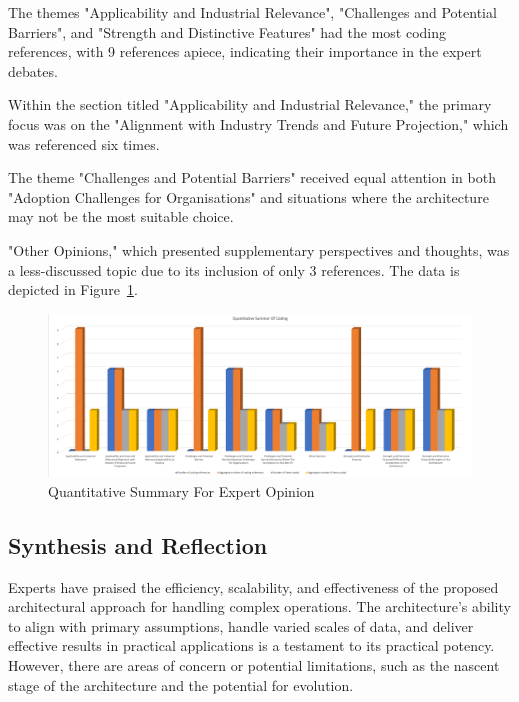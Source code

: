 \documentclass[review]{elsarticle}
\begin{document}
The themes "Applicability and Industrial Relevance", "Challenges and Potential Barriers", and "Strength and Distinctive Features" had the most coding references, with 9 references apiece, indicating their importance in the expert debates.

Within the section titled "Applicability and Industrial Relevance," the primary focus was on the "Alignment with Industry Trends and Future Projection," which was referenced six times.

The theme "Challenges and Potential Barriers" received equal attention in both "Adoption Challenges for Organisations" and situations where the architecture may not be the most suitable choice.

"Other Opinions," which presented supplementary perspectives and thoughts, was a less-discussed topic due to its inclusion of only 3 references. The data is depicted in Figure~\ref{fig:quantitativeSummaryForExpertOpinion}.

\begin{figure}[h]

  \centering

  \includegraphics[width=\textwidth]{images/Quantitative-Summary-For-Codes.png}

  \caption{Quantitative Summary For Expert Opinion}

  \label{fig:quantitativeSummaryForExpertOpinion}

\end{figure}

\subsection{Synthesis and Reflection} \label{expertOpinion_synthesisReflection}

Experts have praised the efficiency, scalability, and effectiveness of the proposed architectural approach for handling complex operations. The architecture's ability to align with primary assumptions, handle varied scales of data, and deliver effective results in practical applications is a testament to its practical potency. However, there are areas of concern or potential limitations, such as the nascent stage of the architecture and the potential for evolution.
\end{document}
